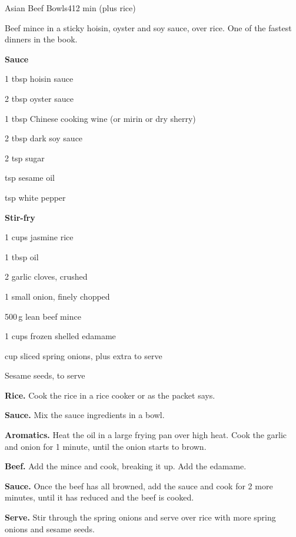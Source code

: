 \begin{recipebox}{Asian Beef Bowls}{4}{12 min (plus rice)}

Beef mince in a sticky hoisin, oyster and soy sauce, over rice. One of the
fastest dinners in the book.

\begin{ingredients}
  \item[] \textbf{Sauce}
  \item 1 tbsp hoisin sauce
  \item 2 tbsp oyster sauce
  \item 1 tbsp Chinese cooking wine (or mirin or dry sherry)
  \item 2 tbsp dark soy sauce
  \item 2 tsp sugar
  \item {} tsp sesame oil
  \item {} tsp white pepper
  \item[] \textbf{Stir-fry}
  \item 1 cups jasmine rice
  \item 1 tbsp oil
  \item 2 garlic cloves, crushed
  \item 1 small onion, finely chopped
  \item 500\,g lean beef mince
  \item 1 cups frozen shelled edamame
  \item {} cup sliced spring onions, plus extra to serve
  \item Sesame seeds, to serve
\end{ingredients}

\begin{method}
  \item \textbf{Rice.} Cook the rice in a rice cooker or as the packet says.
  \item \textbf{Sauce.} Mix the sauce ingredients in a bowl.
  \item \textbf{Aromatics.} Heat the oil in a large frying pan over high heat. Cook
        the garlic and onion for 1 minute, until the onion starts to brown.
  \item \textbf{Beef.} Add the mince and cook, breaking it up. Add the edamame.
  \item \textbf{Sauce.} Once the beef has all browned, add the sauce and cook for 2
        more minutes, until it has reduced and the beef is cooked.
  \item \textbf{Serve.} Stir through the spring onions and serve over rice with
        more spring onions and sesame seeds.
\end{method}


\end{recipebox}
